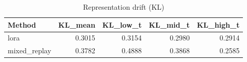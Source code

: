\begin{table}[htbp]
\centering
\caption{Representation drift (KL)}
\label{tab:repr-drift}
\begin{tabular}{lrrrr}
\toprule
\textbf{Method} & \textbf{KL\_mean} & \textbf{KL\_low\_t} & \textbf{KL\_mid\_t} & \textbf{KL\_high\_t} \\
\midrule
lora & 0.3015 & 0.3154 & 0.2980 & 0.2914 \\
mixed\_replay & 0.3782 & 0.4888 & 0.3868 & 0.2585 \\
\bottomrule
\end{tabular}
\end{table}